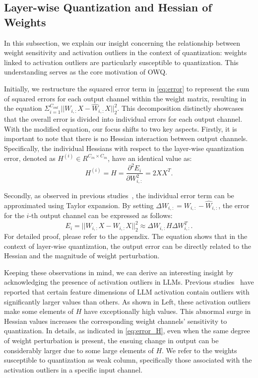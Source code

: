 \documentclass[letterpaper]{article} %
\begin{document}
\subsection{Layer-wise Quantization and Hessian of Weights}
In this subsection, we explain our insight concerning the relationship between weight sensitivity and activation outliers in the context of quantization: weights linked to activation outliers are particularly susceptible to quantization. This understanding serves as the core motivation of OWQ.

Initially, we restructure the squared error term in \cref{eq:error} to represent the sum of squared errors for each output channel within the weight matrix, resulting in the equation $\Sigma_{i=1}^{C_{out}} ||W_{i,:} X - \hat{W}_{i,:} X||^2_2$. This decomposition distinctly showcases that the overall error is divided into individual errors for each output channel. With the modified equation, our focus shifts to two key aspects. Firstly, it is important to note that there is no Hessian interaction between output channels. Specifically, the individual Hessians with respect to the layer-wise quantization error, denoted as $H^{(i)} \in R^{C_{in} \times C_{in}}$, have an identical value as:
\begin{equation}
H^{(i)} = H = \frac{\partial^2E_{i}}{\partial W_{i,:}^2} = 2XX^T.
\label{eq:hessian}
\end{equation}

Secondly, as observed in previous studies~\cite{nagel2020up}, the individual error term can be approximated using Taylor expansion. By setting $\Delta W_{i,:} = W_{i,:} - \hat{W}_{i,:}$, the error for the $i$-th output channel can be expressed as follows:
\begin{equation}
E_i = ||W_{i,:}X - \hat{W}_{i,:}X||_2^2 \approx \Delta W_{i,:} H \Delta W_{i,:}^T.
\label{eq:error_H}
\end{equation}
For detailed proof, please refer to the appendix. The equation shows that in the context of layer-wise quantization, the output error can be directly related to the Hessian and the magnitude of weight perturbation.

Keeping these observations in mind, we can derive an interesting insight by acknowledging the presence of activation outliers in LLMs. Previous studies~\cite{dettmers2022llm, xiao2022smoothquant} have reported that certain feature dimensions of LLM activation contain outliers with significantly larger values than others. As shown in  Left, these activation outliers make some elements of $H$ have exceptionally high values. This abnormal surge in Hessian values increases the corresponding weight channels' sensitivity to quantization. 
In details, as indicated in \cref{eq:error_H}, even when the same degree of weight perturbation is present, the ensuing change in output can be considerably larger due to some large elements of $H$.
We refer to the weights susceptible to quantization as weak column, specifically those associated with the activation outliers in a specific input channel.
\end{document}
